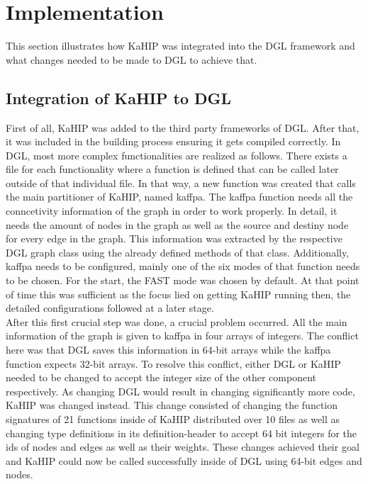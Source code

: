 \documentclass[acmsmall,nonacm,screen,review]{acmart}
\begin{document}
\section{Implementation}
This section illustrates how KaHIP was integrated into the DGL framework and what changes needed to be made to DGL to achieve that.
\subsection{Integration of KaHIP to DGL}
First of all, KaHIP was added to the third party frameworks of DGL. After that, it was included in the building process ensuring it gets compiled correctly. In DGL, most more complex functionalities are realized as follows. There exists a file for each functionality where a function is defined that can be called later outside of that individual file. In that way, a new function was created that calls the main partitioner of KaHIP, named kaffpa. The kaffpa function needs all the conncetivity information of the graph in order to work properly. In detail, it needs the amount of nodes in the graph as well as the source and destiny node for every edge in the graph. This information was extracted by the respective DGL graph class using the already defined methods of that class. Additionally, kaffpa needs to be configured, mainly one of the six modes of that function needs to be chosen. For the start, the FAST mode was chosen by default. At that point of time this was sufficient as the focus lied on getting KaHIP running then, the detailed configurations followed at a later stage.\\
After this first crucial step was done, a crucial problem occurred. All the main information of the graph is given to kaffpa in four arrays of integers. The conflict here was that DGL saves this information in 64-bit arrays while the kaffpa function expects 32-bit arrays. To resolve this conflict, either DGL or KaHIP needed to be changed to accept the integer size of the other component respectively. As changing DGL would result in changing significantly more code, KaHIP was changed instead. This change consisted of changing the function signatures of 21 functions inside of KaHIP distributed over 10 files as well as changing type definitions in its definition-header to accept 64 bit integers for the ids of nodes and edges as well as their weights. These changes achieved their goal and KaHIP could now be called successfully inside of DGL using 64-bit edges and nodes. \\
\end{document}
